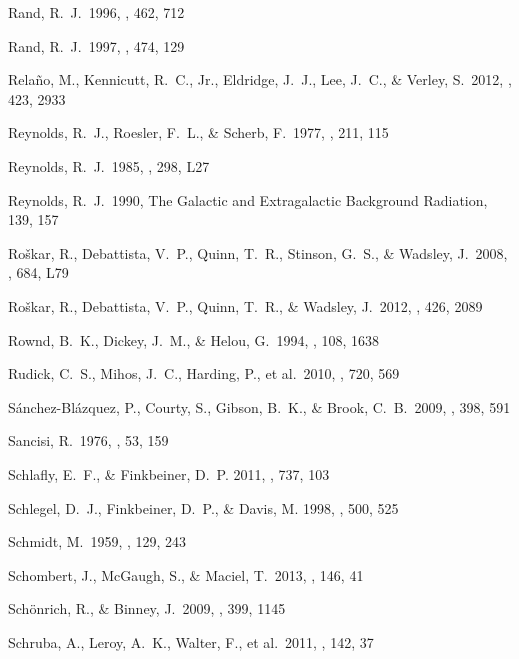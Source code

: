  Rand, R.~J.\ 1996, \apj, 462, 712 


 Rand, R.~J.\ 1997, \apj, 474, 129 


 Rela{\~n}o, M., Kennicutt, R.~C., Jr., Eldridge, J.~J., Lee, J.~C., \& Verley, S.\ 2012, \mnras, 423, 2933 


 Reynolds, R.~J., Roesler, F.~L., \& Scherb, F.\ 1977, \apj, 211, 115 


 Reynolds, R.~J.\ 1985, \apjl, 298, L27 


 Reynolds, R.~J.\ 1990, The Galactic and Extragalactic Background Radiation, 139, 157 


 Ro{\v s}kar, R., Debattista, V.~P., Quinn, T.~R., Stinson, G.~S., \& Wadsley, J.\ 2008, \apjl, 684, L79 


 Ro{\v s}kar, R., Debattista, V.~P., Quinn, T.~R., \& Wadsley, J.\ 2012, \mnras, 426, 2089 

 Rownd, B.~K., Dickey, J.~M., \& Helou, G.\ 1994, \aj, 108, 1638

 Rudick, C.~S., Mihos, J.~C., Harding, P., et al.\ 2010, \apj, 720, 569 

 S{\'a}nchez-Bl{\'a}zquez, P., Courty, S., Gibson, B.~K., \& Brook, C.~B.\ 2009, \mnras, 398, 591 

 Sancisi, R.\ 1976, \aap, 53, 159 

 Schlafly, E.~F., \& Finkbeiner, D.~P. 2011, \apj, 737, 103

 Schlegel, D.~J., Finkbeiner, D.~P., \& Davis, M. 1998, \apj, 500, 525


 Schmidt, M.\ 1959, \apj, 129, 243 


 Schombert, J., McGaugh, S., \& Maciel, T.\ 2013, \aj, 146, 41 

 Sch{\"o}nrich, R., \& Binney, J.\ 2009, \mnras, 399, 1145 

 Schruba, A., Leroy, A.~K., Walter, F., et al.\ 2011, \aj, 142, 37 


